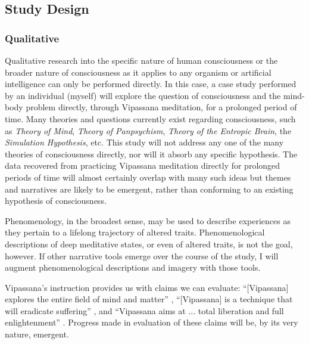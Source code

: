 \documentclass[a4paper, amsfonts, amssymb, amsmath, reprint, showkeys, nofootinbib, twoside]{revtex4-1}
\begin{document}
\subsection{Study Design}

\subsubsection{Qualitative}

Qualitative research into the specific nature of human consciousness or the broader
nature of consciousness as it applies to any organism or artificial intelligence can
only be performed directly. In this case, a case study performed by an individual
(myself) will explore the question of consciousness and the mind-body problem
directly, through Vipassana meditation, for a prolonged period of time.
Many theories and questions currently exist regarding
consciousness, such as \textit{Theory of Mind}, \textit{Theory of Panpsychism},
\textit{Theory of the Entropic Brain},
the \textit{Simulation Hypothesis}, etc. This study will not address any one of the
many theories of consciousness
directly, nor will it absorb any specific hypothesis. The data recovered from
practicing Vipassana meditation directly for prolonged periods of time will almost
certainly overlap with many such ideas but themes and narratives are likely
to be emergent, rather than conforming to an existing hypothesis of consciousness.

Phenomenology, in the broadest sense, may be used to describe experiences as they
pertain to a lifelong trajectory of altered traits. Phenomenological descriptions of
deep meditative states, or even of altered traits, is not the goal,
however. If other narrative tools emerge over the course of the study, I will augment
phenomenological descriptions and imagery with those tools.

Vipassana's instruction provides us with claims we can evaluate:
``[Vipassana] explores the entire field of mind and matter'' \cite{goenka1999discourses},
``[Vipassana] is a technique that will eradicate suffering'' \cite{dhammaorg2014code},
and ``Vipassana aims at ... total liberation and full enlightenment''
\cite{dhammaorg2014code}.
Progress made in evaluation of these claims will be, by its very nature, emergent.
\end{document}
